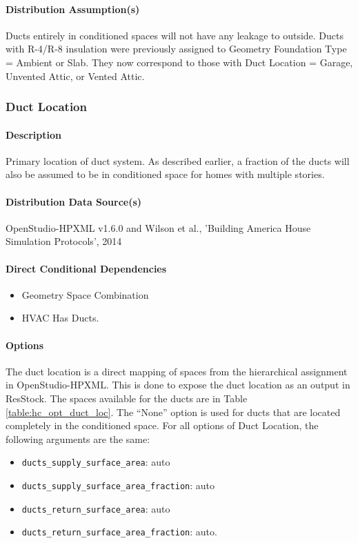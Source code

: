 \paragraph{Distribution Assumption(s)}
Ducts entirely in conditioned spaces will not have any leakage to outside. Ducts with R-4/R-8 insulation were previously assigned to Geometry Foundation Type = Ambient or Slab. They now correspond to those with Duct Location = Garage, Unvented Attic, or Vented Attic. 

\subsubsection{Duct Location}

\paragraph{Description}
Primary location of duct system. As described earlier, a fraction of the ducts will also be assumed to be in conditioned space for homes with multiple stories.

\paragraph{Distribution Data Source(s)}
OpenStudio-HPXML v1.6.0 and Wilson et al., 'Building America House Simulation Protocols', 2014

\paragraph{Direct Conditional Dependencies}
\begin{itemize}
    \item Geometry Space Combination
    \item HVAC Has Ducts.
\end{itemize}

\paragraph{Options}
The duct location is a direct mapping of spaces from the hierarchical assignment in OpenStudio-HPXML. This is done to expose the duct location as an output in ResStock. The spaces available for the ducts are in Table \ref{table:hc_opt_duct_loc}. The ``None'' option is used for ducts that are located completely in the conditioned space. For all options of Duct Location, the following arguments are the same: 
\begin{itemize}
    \item \texttt{ducts\_supply\_surface\_area}: auto
    \item \texttt{ducts\_supply\_surface\_area\_fraction}: auto
    \item  \texttt{ducts\_return\_surface\_area}: auto
    \item \texttt{ducts\_return\_surface\_area\_fraction}: auto.
\end{itemize}

